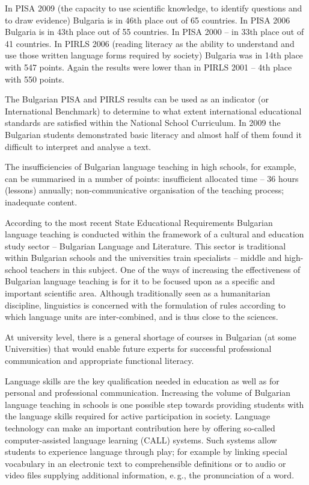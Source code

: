\begin{multicols}{2}
  In PISA 2009 \cite{oecd} (the capacity to use scientific knowledge, to identify questions and to draw evidence) Bulgaria is in 46th place out of 65 countries. In PISA 2006 Bulgaria is in 43th place out of 55 countries. In PISA 2000 -- in 33th place out of 41 countries.  In PIRLS 2006 \cite{nces} (reading literacy as the ability to understand and use those written language forms required by society) Bulgaria was in 14th place with 547 points. Again the results were lower than in PIRLS 2001 -- 4th place with 550 points.

  The Bulgarian PISA and PIRLS results can be used as an indicator (or International Benchmark) to determine to what extent international educational standards are satisfied within the National School Curriculum. In 2009 the Bulgarian students demonstrated basic literacy and almost half of them found it difficult to interpret and analyse a text. 

  The insufficiencies of Bulgarian language teaching in high schools, for example, can be summarised in a number of points: insufficient allocated time – 36 hours (lessons) annually; non-communicative organisation of the teaching process; inadequate content.


  According to the most recent State Educational Requirements Bulgarian language teaching is conducted within the framework of a cultural and education study sector -- Bulgarian Language and Literature. This sector is traditional within Bulgarian schools and the universities train specialists -- middle and high-school teachers in this subject. One of the ways of increasing the effectiveness of Bulgarian language teaching is for it to be focused upon as a specific and important scientific area. Although traditionally seen as a humanitarian discipline, linguistics is concerned with the formulation of rules according to which language units are inter-combined, and is thus close to the sciences. 

  At university level, there is a general shortage of courses in Bulgarian (at some Universities) that would enable future experts for successful professional communication and appropriate functional literacy.

  Language skills are the key qualification needed in education as well as for personal and professional communication. Increasing the volume of Bulgarian language teaching in schools is one possible step towards providing students with the language skills required for active participation in society. Language technology can make an important contribution here by offering so-called computer-assisted language learning (CALL) systems. Such systems allow students to experience language through play; for example by linking special vocabulary in an electronic text to comprehensible definitions or to audio or video files supplying additional information, e.\,g., the pronunciation of a word. 


\end{multicols}
